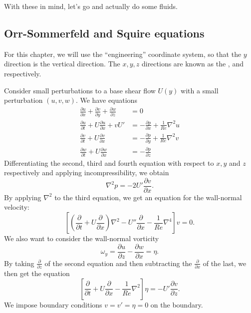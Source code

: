 \documentclass[a4paper]{article}
\begin{document}
With these in mind, let's go and actually do some fluids.

\subsection{Orr-Sommerfeld and Squire equations}
For this chapter, we will use the ``engineering'' coordinate system, so that the $y$ direction is the vertical direction. The $x, y, z$ directions are known as the ,  and  respectively.

Consider small perturbations to a base shear flow $U(y)$ with a small perturbation $(u, v, w)$. We have equations
\begin{align*}
  \frac{\partial u}{\partial x} + \frac{\partial v}{\partial y} + \frac{\partial w}{\partial z} &= 0\\
  \frac{\partial u}{\partial t} + U \frac{\partial u}{\partial x} + v U' &= - \frac{\partial p}{\partial x} + \frac{1}{Re}\nabla^2 u\\
  \frac{\partial v}{\partial t} + U \frac{\partial v}{\partial x} &= - \frac{\partial p}{\partial y} + \frac{1}{Re} \nabla^2 v\\
  \frac{\partial w}{\partial t} + U \frac{\partial w}{\partial x} &= - \frac{\partial p}{\partial z}
\end{align*}
Differentiating the second, third and fourth equation with respect to $x, y$ and $z$ respectively and applying incompressibility, we obtain
\[
  \nabla^2 p = -2U' \frac{\partial v}{\partial x}.
\]
By applying $\nabla^2$ to the third equation, we get an equation for the wall-normal velocity:
\[
  \left[ \left(\frac{\partial}{\partial t} + U \frac{\partial}{\partial x}\right)\nabla^2 - U'' \frac{\partial}{\partial x} - \frac{1}{Re}\nabla^4\right] v = 0.
\]
We also want to consider the wall-normal vorticity
\[
  \omega_y = \frac{\partial u}{\partial z} - \frac{\partial w}{\partial x} = \eta.
\]
By taking $\frac{\partial}{\partial z}$ of the second equation and then subtracting the $\frac{\partial}{\partial x}$ of the last, we then get the equation
\[
  \left[\frac{\partial}{\partial t} + U \frac{\partial}{\partial x} - \frac{1}{Re} \nabla^2\right] \eta = - U' \frac{\partial v}{\partial z}.
\]
We impose boundary conditions $v = v' = \eta = 0$ on the boundary. 
\end{document}
